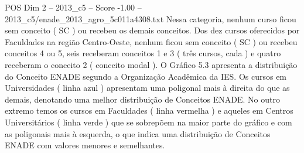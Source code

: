 \begin{textsample}{POS Dim 2 – 2013\_c5 – Score -1.00 – 2013\_c5/enade\_2013\_agro\_5c011a4308.txt}
Nessa categoria, nenhum curso ficou sem conceito ( SC ) ou recebeu os demais conceitos.
Dos dez cursos oferecidos por Faculdades na região Centro-Oeste, nenhum ficou sem conceito ( SC ) ou recebeu conceitos 4 ou 5, seis receberam conceitos 1 e 3 ( três cursos, cada ) e quatro receberam o conceito 2 ( conceito modal ).
O Gráfico 5.3 apresenta a distribuição do Conceito ENADE segundo a Organização Acadêmica da IES.
Os cursos em Universidades ( linha azul ) apresentam uma poligonal mais à direita do que as demais, denotando uma melhor distribuição de Conceitos ENADE.
No outro extremo temos os cursos em Faculdades ( linha vermelha ) e aqueles em Centros Universitários ( linha verde ) que se sobrepõem na maior parte do gráfico e com as poligonais mais à esquerda, o que indica uma distribuição de Conceitos ENADE com valores menores e semelhantes.

\end{textsample}
